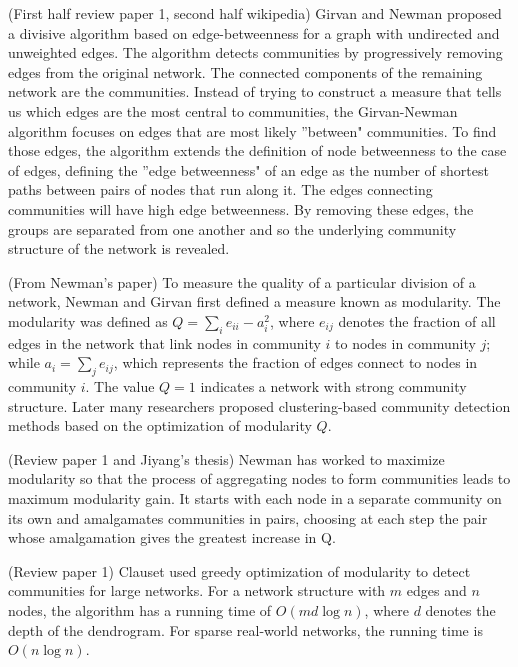 \documentclass[\main/thesis.tex]{subfiles}
\begin{document}
(First half review paper 1, second half wikipedia) Girvan and Newman proposed a divisive algorithm based on edge-betweenness for a graph with undirected and unweighted edges. The algorithm detects communities by progressively removing edges from the original network. The connected components of the remaining network are the communities. Instead of trying to construct a measure that tells us which edges are the most central to communities, the Girvan-Newman algorithm focuses on edges that are most likely ''between" communities. To find those edges, the algorithm extends the definition of node betweenness to the case of edges, defining the ''edge betweenness" of an edge as the number of shortest paths between pairs of nodes that run along it. The edges connecting communities will have high edge betweenness. By removing these edges, the groups are separated from one another and so the underlying community structure of the network is revealed.

(From Newman's paper) To measure the quality of a particular division of a network, Newman and Girvan \cite{newman2004finding} first defined a measure known as modularity. The modularity was defined as $Q=\sum_ie_{ii}-a_i^2$, where $e_{ij}$ denotes the fraction of all edges in the network that link nodes in community $i$ to nodes in community $j$; while $a_i=\sum_je_{ij}$, which represents the fraction of edges connect to nodes in community $i$. The value $Q = 1$ indicates a network with strong community structure. Later many researchers proposed clustering-based community detection methods based on the optimization of modularity $Q$.

(Review paper 1 and Jiyang's thesis) Newman \cite{newman2004fast} has worked to maximize modularity so that the process of aggregating nodes to form communities leads to maximum modularity gain. It starts with each node in a separate community on its own and amalgamates communities in pairs, choosing at each step the pair whose amalgamation gives the greatest increase in Q.

(Review paper 1) Clauset \cite{clauset2004finding} used greedy optimization of modularity to detect communities for large networks. For a network structure with $m$ edges and $n$ nodes, the algorithm has a running time of $O(md \log n)$, where $d$ denotes the depth of the dendrogram. For sparse real-world networks, the running time is $O(n\log n)$.
\end{document}
